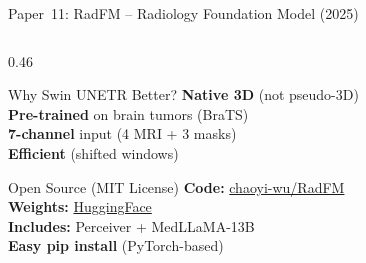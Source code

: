 \documentclass[aspectratio=169,xcolor=dvipsnames]{beamer}
\begin{document}
\begin{frame}{Paper~11: RadFM -- Radiology Foundation Model (2025)}
\begin{columns}
\begin{column}{0.46\textwidth}
            \vspace{0.2em}

            \begin{block}{\scriptsize Why Swin UNETR Better?}
                \scriptsize
                \textbf{Native 3D} (not pseudo-3D)\\
                \textbf{Pre-trained} on brain tumors (BraTS)\\
                \textbf{7-channel} input (4 MRI + 3 masks)\\
                \textbf{Efficient} (shifted windows)
            \end{block}




            \begin{block}{\scriptsize {} Open Source (MIT License)}
                \scriptsize
                \textbf{Code:} \href{https://github.com/chaoyi-wu/RadFM}{chaoyi-wu/RadFM}\\
                \textbf{Weights:} \href{https://huggingface.co/chaoyi-wu/RadFM}{HuggingFace}\\
                \textbf{Includes:} Perceiver + MedLLaMA-13B\\
                \textbf{Easy pip install} (PyTorch-based)
            \end{block}
        \end{column}
    \end{columns}
\end{frame}
\end{document}
